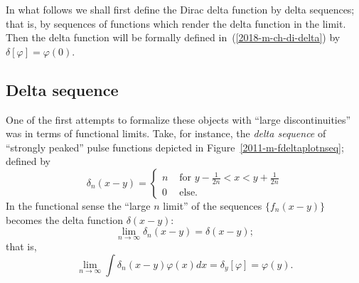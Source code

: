 In what follows we shall first define the Dirac delta function by delta sequences; that is, by sequences of functions which render the
delta function in the limit.
Then the delta function will be formally defined in~(\ref{2018-m-ch-di-delta}) by $\delta [\varphi ]=\varphi (0)$.

\subsection{Delta sequence}
One of the first attempts to formalize these objects with ``large discontinuities''
was in terms
of functional limits.
Take, for instance, the {\em delta sequence}
of ``strongly peaked'' pulse functions
depicted in Figure~\ref{2011-m-fdeltaplotnseq};
defined by
\begin{equation}
\delta_n(x-y) =
\left\{
\begin{array}{rl}
n & \textrm{ for } y - \frac{1}{2n}  < x < y+ \frac{1}{2n} \\
0& \textrm{ else. }
\end{array}
\right.
\label{2011-m-deltseq}
\end{equation}
In  the functional sense the ``large $n$ limit''   of
the sequences $\{f_n(x-y)\}$
 becomes the delta function $\delta (x-y)$:
\begin{equation}
\lim_{n\rightarrow \infty} \delta_n(x-y)= \delta (x-y) ;
\end{equation}
that is,
\begin{equation}
\lim_{n\rightarrow \infty} \int \delta_n(x-y) \varphi (x) dx = \delta_y [\varphi ]=\varphi (y).
\end{equation}
